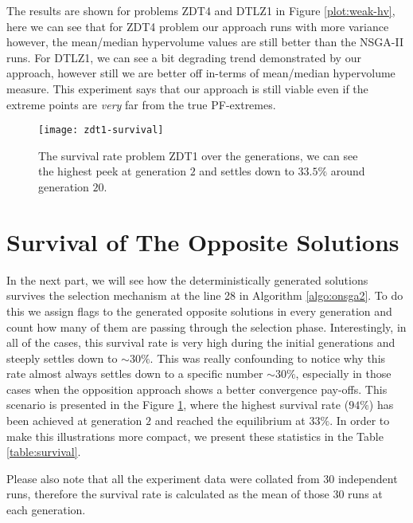 \documentclass[journal]{IEEEtran}
\let\MYoriglatexcaption\caption
\renewcommand{\caption}[2][\relax]{\MYoriglatexcaption[#2]{#2}}
\begin{document}
The results are shown for problems ZDT4 and DTLZ1 in Figure \ref{plot:weak-hv}, here we can see that for ZDT4 problem our approach runs with more variance however, the mean/median hypervolume values are still better than the NSGA-II runs. For DTLZ1, we can see a bit degrading trend demonstrated by our approach, however still we are better off in-terms of mean/median hypervolume measure. This experiment says that our approach is still viable even if the extreme points are \textit{very} far from the true PF-extremes.
\begin{figure}[t]
\centering
\texttt{[image: zdt1-survival]}
\caption{The survival rate problem ZDT1 over the generations, we can see the highest peek at generation \(2\) and settles down to \(33.5\%\) around generation \(20\).}
\label{plot:zdt1-survival}
\end{figure}
%
\section{Survival of The Opposite Solutions}
\label{sec:survival}
In the next part, we will see how the deterministically generated solutions survives the selection mechanism at the line 28 in Algorithm \ref{algo:onsga2}. To do this we assign flags to the generated opposite solutions in every generation and count how many of them are passing through the selection phase. Interestingly, in all of the cases, this survival rate is very high during the initial generations and steeply settles down to \(\sim30\%\). This was really confounding to notice why this rate almost always settles down to a specific number \(\sim30\%\), especially in those cases when the opposition approach shows a better convergence pay-offs. This scenario is presented in the Figure \ref{plot:zdt1-survival}, where the highest survival rate (\(94\%\)) has been achieved at generation \(2\) and reached the equilibrium at \(33\%\). In order to make this illustrations more compact, we present these statistics in the Table \ref{table:survival}.

Please also note that all the experiment data were collated from \(30\) independent runs, therefore the survival rate is calculated as the mean of those \(30\) runs at each generation.\vfill \eject
\end{document}
